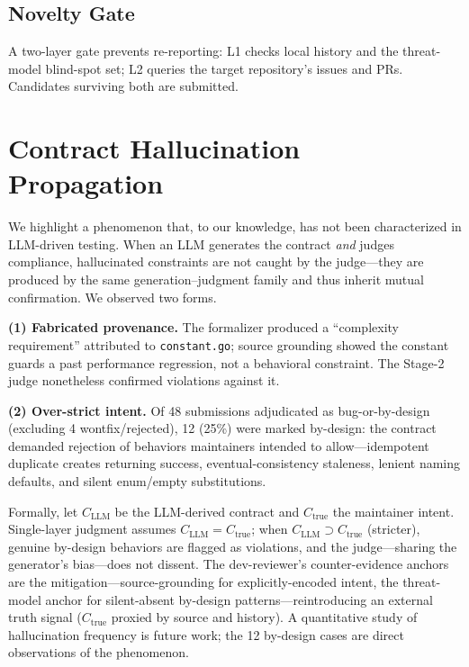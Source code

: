 \documentclass[sigconf, anonymous, review]{acmart}
\begin{document}
\subsection{Novelty Gate}
A two-layer gate prevents re-reporting: L1 checks local history and the threat-model blind-spot set; L2 queries the target repository's issues and PRs. Candidates surviving both are submitted.

\section{Contract Hallucination Propagation}\label{sec:hallucination}
We highlight a phenomenon that, to our knowledge, has not been characterized in LLM-driven testing. When an LLM generates the contract \emph{and} judges compliance, hallucinated constraints are not caught by the judge---they are produced by the same generation--judgment family and thus inherit mutual confirmation. We observed two forms.

\textbf{(1) Fabricated provenance.} The formalizer produced a ``complexity requirement'' attributed to \texttt{constant.go}; source grounding showed the constant guards a past performance regression, not a behavioral constraint. The Stage-2 judge nonetheless confirmed violations against it.

\textbf{(2) Over-strict intent.} Of 48 submissions adjudicated as bug-or-by-design (excluding 4 wontfix/rejected), 12 (25\%) were marked by-design: the contract demanded rejection of behaviors maintainers intended to allow---idempotent duplicate creates returning success, eventual-consistency staleness, lenient naming defaults, and silent enum/empty substitutions.

Formally, let $C_{\mathrm{LLM}}$ be the LLM-derived contract and $C_{\mathrm{true}}$ the maintainer intent. Single-layer judgment assumes $C_{\mathrm{LLM}} = C_{\mathrm{true}}$; when $C_{\mathrm{LLM}} \supset C_{\mathrm{true}}$ (stricter), genuine by-design behaviors are flagged as violations, and the judge---sharing the generator's bias---does not dissent. The dev-reviewer's counter-evidence anchors are the mitigation---source-grounding for explicitly-encoded intent, the threat-model anchor for silent-absent by-design patterns---reintroducing an external truth signal ($C_{\mathrm{true}}$ proxied by source and history). A quantitative study of hallucination frequency is future work; the 12 by-design cases are direct observations of the phenomenon.
\end{document}
